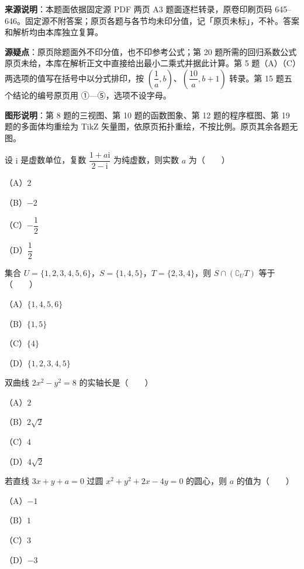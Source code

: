 \begin{gktip}
\textbf{来源说明}：本题面依据固定源 PDF 两页 A3 题面逐栏转录，原卷印刷页码 645–646。固定源不附答案；原页各题与各节均未印分值，记「原页未标」，不补。答案和解析均由本库独立复算。

\textbf{源疑点}：原页除题面外不印分值，也不印参考公式；第 20 题所需的回归系数公式原页未给，本库在解析正文中直接给出最小二乘式并据此计算。第 5 题（A）（C）两选项的值写在括号中以分式排印，按 $\left(\dfrac1a,b\right)$、$\left(\dfrac{10}{a},b+1\right)$ 转录。第 15 题五个结论的编号原页用 ①—⑤，选项不设字母。

\textbf{图形说明}：第 8 题的三视图、第 10 题的函数图象、第 12 题的程序框图、第 19 题的多面体均重绘为 TikZ 矢量图，依原页拓扑重绘，不按比例。原页其余各题无图。
\end{gktip}
\begin{question}
设 $\mathrm i$ 是虚数单位，复数 $\dfrac{1+a\mathrm i}{2-\mathrm i}$ 为纯虚数，则实数 $a$ 为\mbox{（　　）}

（A）$2$

（B）$-2$

（C）$-\dfrac12$

（D）$\dfrac12$
\end{question}
\begin{question}
集合 $U=\{1,2,3,4,5,6\}$，$S=\{1,4,5\}$，$T=\{2,3,4\}$，则 $S\cap(\complement_U T)$ 等于\mbox{（　　）}

（A）$\{1,4,5,6\}$

（B）$\{1,5\}$

（C）$\{4\}$

（D）$\{1,2,3,4,5\}$
\end{question}
\begin{question}
双曲线 $2x^2-y^2=8$ 的实轴长是\mbox{（　　）}

（A）$2$

（B）$2\sqrt2$

（C）$4$

（D）$4\sqrt2$
\end{question}
\begin{question}
若直线 $3x+y+a=0$ 过圆 $x^2+y^2+2x-4y=0$ 的圆心，则 $a$ 的值为\mbox{（　　）}

（A）$-1$

（B）$1$

（C）$3$

（D）$-3$
\end{question}

